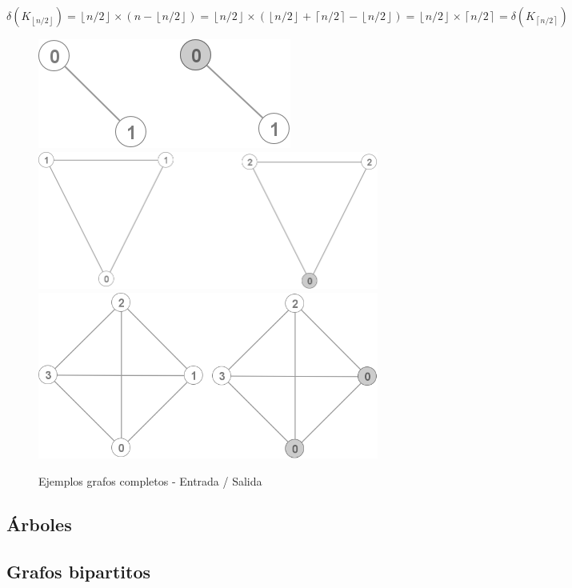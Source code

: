 	\( 
	\delta(K_{\left \lfloor{n/2}\right \rfloor}) = 
	\left \lfloor{n/2} \right \rfloor \times 
	(n - \left \lfloor{n/2} \right \rfloor ) = 
	\left \lfloor{n/2} \right \rfloor \times 
	(\left \lfloor{n/2} \right \rfloor +
	\left \lceil{n/2} \right \rceil - 
	\left \lfloor{n/2} \right \rfloor) =
	\left \lfloor{n/2} \right \rfloor \times
	\left \lceil{n/2} \right \rceil = 
	\delta(K_{\left \lceil{n/2}\right \rceil})
	\)
\begin{figure}[H]
\caption{Ejemplos grafos completos - Entrada / Salida}
\centering
\includegraphics[scale = 0.5]{img/ej2/k2.png}
\includegraphics[scale = 0.5]{img/ej2/k3.png}
\includegraphics[scale = 0.5]{img/ej2/k4.png}
\end{figure}

\subsection{\'Arboles}
\subsection{Grafos bipartitos}

